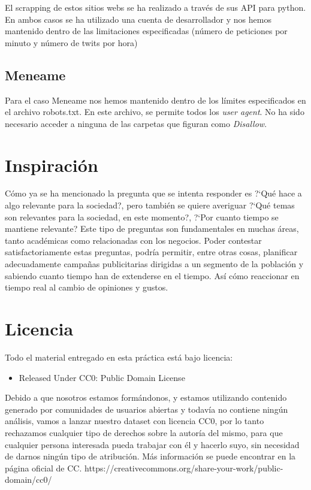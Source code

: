 \documentclass[a4paper,12pt]{article}
\begin{document}
El scrapping de estos sitios webs se ha realizado a trav\'es de sus API para python. En ambos casos se ha utilizado una cuenta de desarrollador y nos hemos mantenido dentro de las limitaciones especificadas (n\'umero de peticiones por minuto y n\'umero de twits por hora)

\subsection{Meneame}

Para el caso Meneame nos hemos mantenido dentro de los l\'imites especificados en el archivo robots.txt. En este archivo, se permite todos los {\itshape user agent}. No ha sido necesario acceder a ninguna de las carpetas que figuran como {\itshape Disallow}.


\section{Inspiraci\'on}

C\'omo ya se ha mencionado la pregunta que se intenta responder es ?`Qu\'e hace a algo relevante para la sociedad?, pero tambi\'en se quiere averiguar ?`Qu\'e temas son relevantes para la sociedad, en este momento?, ?`Por cuanto tiempo se mantiene  relevante? Este tipo de preguntas son fundamentales en muchas \'areas, tanto acad\'emicas como relacionadas con los negocios. Poder contestar satisfactoriamente estas preguntas, podr\'ia permitir, entre otras cosas, planificar adecuadamente campa\~nas publicitarias dirigidas a un segmento de la poblaci\'on y sabiendo cuanto tiempo han de extenderse en el tiempo. As\'i c\'omo reaccionar en tiempo real al cambio de opiniones y gustos.

\section{Licencia}

Todo el material entregado en esta pr\'actica est\'a bajo licencia:

\begin{itemize}

\item Released Under CC0: Public Domain License


\end{itemize}

Debido a que nosotros estamos form\'andonos, y estamos utilizando contenido generado por comunidades de usuarios abiertas y todav\'ia no contiene ning\'un an\'alisis, vamos a lanzar nuestro dataset con licencia CC0, por lo tanto rechazamos cualquier tipo de derechos sobre la autor\'ia del mismo, para que cualquier persona interesada pueda trabajar con \'el y hacerlo suyo, sin necesidad de darnos ning\'un tipo de atribuci\'on.  M\'as informaci\'on se puede encontrar en la p\'agina oficial de CC.
https://creativecommons.org/share-your-work/public-domain/cc0/
\end{document}
